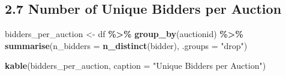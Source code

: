 \documentclass[
]{article}
\newenvironment{Shaded}{\begin{snugshade}}{\end{snugshade}}
\newcommand{\AttributeTok}[1]{\textcolor[rgb]{0.13,0.29,0.53}{#1}}
\newcommand{\FunctionTok}[1]{\textcolor[rgb]{0.13,0.29,0.53}{\textbf{#1}}}
\newcommand{\NormalTok}[1]{#1}
\newcommand{\OtherTok}[1]{\textcolor[rgb]{0.56,0.35,0.01}{#1}}
\newcommand{\SpecialCharTok}[1]{\textcolor[rgb]{0.81,0.36,0.00}{\textbf{#1}}}
\newcommand{\StringTok}[1]{\textcolor[rgb]{0.31,0.60,0.02}{#1}}
\begin{document}
\subsection{2.7 Number of Unique Bidders per
Auction}\label{number-of-unique-bidders-per-auction}

\begin{Shaded}
\begin{Highlighting}[]
\NormalTok{bidders\_per\_auction }\OtherTok{\textless{}{-}}\NormalTok{ df }\SpecialCharTok{\%\textgreater{}\%}
  \FunctionTok{group\_by}\NormalTok{(auctionid) }\SpecialCharTok{\%\textgreater{}\%}
  \FunctionTok{summarise}\NormalTok{(}\AttributeTok{n\_bidders =} \FunctionTok{n\_distinct}\NormalTok{(bidder), }\AttributeTok{.groups =} \StringTok{"drop"}\NormalTok{)}

\FunctionTok{kable}\NormalTok{(bidders\_per\_auction, }\AttributeTok{caption =} \StringTok{"Unique Bidders per Auction"}\NormalTok{)}
\end{Highlighting}
\end{Shaded}
\end{document}
